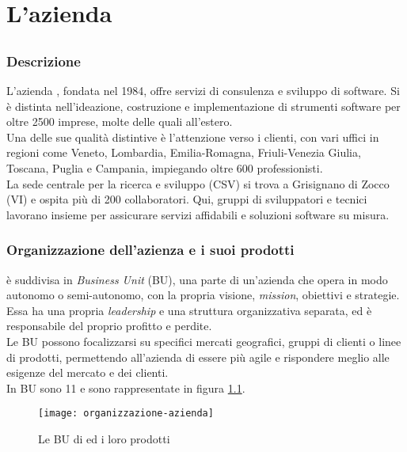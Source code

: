 \chapter{L'azienda}
\label{cap:lazienda}


\section{\azienda}

\subsection{Descrizione}
L'azienda {\azienda}, fondata nel 1984, offre servizi di consulenza e sviluppo di software. 
Si è distinta nell'ideazione, costruzione e implementazione di strumenti software per oltre 2500 imprese, 
molte delle quali all'estero. \\
Una delle sue qualità distintive è l'attenzione verso i clienti, 
con vari uffici in regioni come Veneto, Lombardia, Emilia-Romagna, Friuli-Venezia Giulia, Toscana, Puglia e Campania, 
impiegando oltre 600 professionisti. \\
La sede centrale per la ricerca e sviluppo (CSV) si trova a Grisignano di Zocco (VI) e ospita più di 200 collaboratori. 
Qui, gruppi di sviluppatori 
e tecnici lavorano insieme per assicurare servizi affidabili e soluzioni software su misura. 
\newpage

\subsection{Organizzazione dell'azienza e i suoi prodotti}
{\azienda} è suddivisa in \textit{Business Unit} (BU), una parte di un'azienda che opera in modo autonomo o semi-autonomo, 
con la propria visione, \textit{mission}, obiettivi e strategie. Essa ha una propria \textit{leadership} e una struttura 
organizzativa separata, ed è responsabile del proprio profitto e perdite. \\
Le BU possono focalizzarsi su 
specifici mercati geografici, gruppi di clienti o linee di prodotti, permettendo all'azienda di essere 
più agile e rispondere meglio alle esigenze del mercato e dei clienti.\\
In {\azienda} BU sono 11 e sono rappresentate in figura \ref{fig:organizzazione-azienda}.\\

\begin{figure}[!h] 
  \centering 
  \texttt{[image: organizzazione-azienda]} 
  \caption{Le BU di {\azienda} ed i loro prodotti}
  \label{fig:organizzazione-azienda}
\end{figure}

